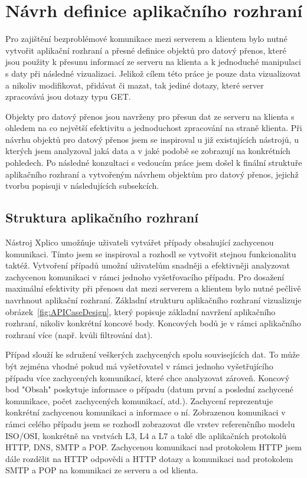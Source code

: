 \section{Návrh definice aplikačního rozhraní}
    Pro zajištění bezproblémové komunikace mezi serverem a klientem bylo nutné vytvořit aplikační rozhraní a přesné definice objektů pro datový přenos, které jsou použity k přesunu informací ze serveru na klienta a k jednoduché manipulaci s daty při následné vizualizaci. Jelikož cílem této práce je pouze data vizualizovat a nikoliv modifikovat, přidávat či mazat, tak jediné dotazy, které server zpracovává jsou dotazy typu GET. 
    
    Objekty pro datový přenos jsou navrženy pro přesun dat ze serveru na klienta s ohledem na co největší efektivitu a jednoduchost zpracování na straně klienta. Při návrhu objektů pro datový přenos jsem se inspiroval u již existujících nástrojů, u kterých jsem analyzoval jaká data a v jaké podobě se zobrazují na konkrétních pohledech. Po následné konzultaci s vedoucím práce jsem došel k finální struktuře aplikačního rozhraní a vytvořeným návrhem objektům pro datový přenos, jejichž tvorbu popisuji v následujících subsekcích.

    \subsection{Struktura aplikačního rozhraní}
        Nástroj Xplico umožňuje uživateli vytvářet případy obsahující zachycenou komunikaci. Tímto jsem se inspiroval a rozhodl se vytvořit stejnou funkcionalitu taktéž. Vytvoření případů umožní uživatelům snadněji a efektivněji analyzovat zachycenou komunikaci v rámci jednoho vyšetřovacího případu. Pro dosažení maximální efektivity při přenosu dat mezi serverem a klientem bylo nutné pečlivě navrhnout aplikační rozhraní. Základní strukturu aplikačního rozhraní vizualizuje obrázek~\ref{fig:APICaseDesign}, který popisuje základní navržení aplikačního rozhraní, nikoliv konkrétní koncové body. Koncových bodů je v rámci aplikačního rozhraní více (např. kvůli filtrování dat).
        
        Případ slouží ke sdružení veškerých zachycených spolu souvisejících dat. To může být zejména vhodné pokud má vyšetřovatel v rámci jednoho vyšetřujícího případu více zachycených komunikací, které chce analyzovat zároveň. Koncový bod "Obsah" poskytuje informace o případu (datum první a poslední zachycené komunikace, počet zachycených komunikací, atd.). Zachycení reprezentuje konkrétní zachycenou komunikaci a informace o ní. Zobrazenou komunikaci v rámci celého případu jsem se rozhodl zobrazovat dle vrstev referenčního modelu ISO/OSI, konkrétně na vrstvách L3, L4 a L7 a také dle aplikačních protokolů \gls{HTTP}, \gls{DNS}, \gls{SMTP} a \gls{POP}. Zachycenou komunikaci nad protokolem \gls{HTTP} jsem dále rozdělit na \gls{HTTP} odpovědi a \gls{HTTP} dotazy a komunikaci nad protokolem \gls{SMTP} a \gls{POP} na komunikaci ze serveru a od klienta.
        
